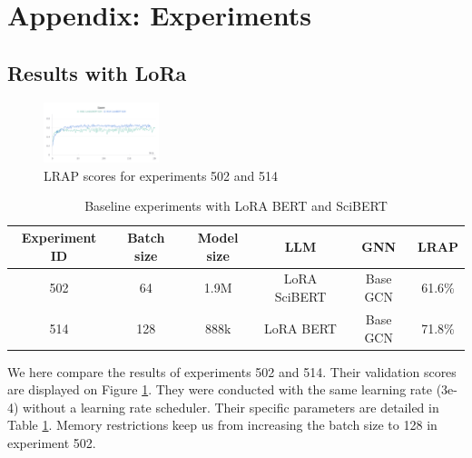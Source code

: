 \section{Appendix: Experiments}
\label{sec:experiments}
\subsection{Results with LoRa}
\label{sec:lora}
\begin{figure}
\includegraphics[width=0.3\textwidth]{figures/502_514.png}
\caption{LRAP scores for experiments 502 and 514}
\label{502_fig}
\end{figure}
\begin{table}[!]
    \centering
    \begin{tabular}{|c|c|c|c|c|c|}
    \hline
    \textbf{Experiment ID} &\textbf{Batch size}& \textbf{Model size} & \textbf{LLM} & \textbf{GNN} & \textbf{LRAP} \\ \hline
    502         &  64    &1.9M & LoRA SciBERT  & Base GCN  & 61.6\%      \\ \hline
     514         &  128    &888k & LoRA BERT  & Base GCN  & 71.8\%      \\ \hline
    \end{tabular}
    \caption{Baseline experiments with LoRA BERT and SciBERT}
    \label{tab:lora}
\end{table}
We here compare the results of experiments 502 and 514. Their validation scores are displayed on Figure \ref{502_fig}. They were conducted with the same learning rate (3e-4) without a learning rate scheduler. Their specific parameters are detailed in Table \ref{tab:lora}. Memory restrictions keep us from increasing the batch size to 128 in experiment 502.


